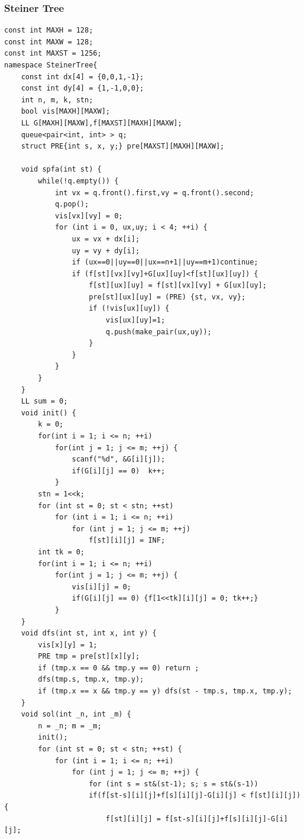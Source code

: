 \documentclass[10pt]{ctexart}
\begin{document}
{\subsubsection{Steiner Tree}
\begin{lstlisting}
const int MAXH = 128;
const int MAXW = 128;
const int MAXST = 1256;
namespace SteinerTree{
    const int dx[4] = {0,0,1,-1};
    const int dy[4] = {1,-1,0,0};
    int n, m, k, stn;
    bool vis[MAXH][MAXW];
    LL G[MAXH][MAXW],f[MAXST][MAXH][MAXW];
    queue<pair<int, int> > q;
    struct PRE{int s, x, y;} pre[MAXST][MAXH][MAXW];

    void spfa(int st) {
        while(!q.empty()) {
            int vx = q.front().first,vy = q.front().second;
            q.pop();
            vis[vx][vy] = 0;
            for (int i = 0, ux,uy; i < 4; ++i) {
                ux = vx + dx[i];
                uy = vy + dy[i];
                if (ux==0||uy==0||ux==n+1||uy==m+1)continue;
                if (f[st][vx][vy]+G[ux][uy]<f[st][ux][uy]) {
                    f[st][ux][uy] = f[st][vx][vy] + G[ux][uy];
                    pre[st][ux][uy] = (PRE) {st, vx, vy};
                    if (!vis[ux][uy]) {
                        vis[ux][uy]=1;
                        q.push(make_pair(ux,uy));
                    }
                }
            }
        }
    }
    LL sum = 0;
    void init() {
        k = 0;
        for(int i = 1; i <= n; ++i)
            for(int j = 1; j <= m; ++j) {
                scanf("%d", &G[i][j]);
                if(G[i][j] == 0)  k++;
            }
        stn = 1<<k;
        for (int st = 0; st < stn; ++st)
            for (int i = 1; i <= n; ++i)
                for (int j = 1; j <= m; ++j)
                    f[st][i][j] = INF;
        int tk = 0;
        for(int i = 1; i <= n; ++i)
            for(int j = 1; j <= m; ++j) {
                vis[i][j] = 0;
                if(G[i][j] == 0) {f[1<<tk][i][j] = 0; tk++;}
            }
    }
    void dfs(int st, int x, int y) {
        vis[x][y] = 1;
        PRE tmp = pre[st][x][y];
        if (tmp.x == 0 && tmp.y == 0) return ;
        dfs(tmp.s, tmp.x, tmp.y);
        if (tmp.x == x && tmp.y == y) dfs(st - tmp.s, tmp.x, tmp.y);
    }
    void sol(int _n, int _m) {
        n = _n; m = _m;
        init();
        for (int st = 0; st < stn; ++st) {
            for (int i = 1; i <= n; ++i)
                for (int j = 1; j <= m; ++j) {
                    for (int s = st&(st-1); s; s = st&(s-1))
                    if(f[st-s][i][j]+f[s][i][j]-G[i][j] < f[st][i][j]){	
                        f[st][i][j] = f[st-s][i][j]+f[s][i][j]-G[i][j];

\end{lstlisting}}
\end{document}
